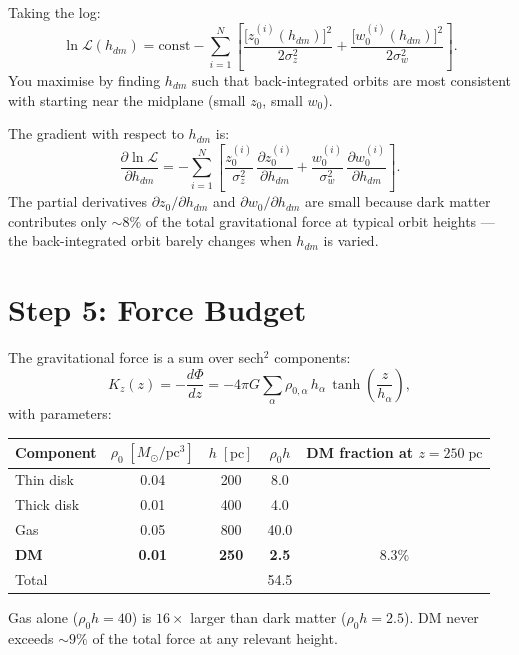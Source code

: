 \documentclass[12pt]{article}
\begin{document}
Taking the log:
\[
  \ln\mathcal{L}(h_{dm})
  = \mathrm{const}
    - \sum_{i=1}^{N}
      \left[
        \frac{\bigl[z_0^{(i)}(h_{dm})\bigr]^{2}}{2\sigma_z^{2}}
        +
        \frac{\bigl[w_0^{(i)}(h_{dm})\bigr]^{2}}{2\sigma_w^{2}}
      \right].
\]
You maximise by finding $h_{dm}$ such that back-integrated orbits are most
consistent with starting near the midplane (small $z_0$, small $w_0$).

The gradient with respect to $h_{dm}$ is:
\[
  \frac{\partial \ln\mathcal{L}}{\partial h_{dm}}
  = -\sum_{i=1}^{N}
    \left[
      \frac{z_0^{(i)}}{\sigma_z^{2}}\,\frac{\partial z_0^{(i)}}{\partial h_{dm}}
      +
      \frac{w_0^{(i)}}{\sigma_w^{2}}\,\frac{\partial w_0^{(i)}}{\partial h_{dm}}
    \right].
\]
The partial derivatives $\partial z_0/\partial h_{dm}$ and $\partial w_0/\partial h_{dm}$
are small because dark matter contributes only $\sim 8\%$ of the total gravitational
force at typical orbit heights --- the back-integrated orbit barely changes when
$h_{dm}$ is varied.

\section*{Step 5: Force Budget}

The gravitational force is a sum over sech$^2$ components:
\[
  K_z(z) = -\frac{d\Phi}{dz}
  = -4\pi G\sum_\alpha \rho_{0,\alpha}\,h_\alpha\,\tanh\!\left(\frac{z}{h_\alpha}\right),
\]
with parameters:

\vspace{0.5em}
\begin{center}
\begin{tabular}{lcccc}
\toprule
Component & $\rho_0\;[M_\odot/\mathrm{pc}^3]$ & $h\;[\mathrm{pc}]$
          & $\rho_0 h$ & DM fraction at $z=250\;\mathrm{pc}$ \\
\midrule
Thin disk  & 0.04 & 200 & 8.0  & \\
Thick disk & 0.01 & 400 & 4.0  & \\
Gas        & 0.05 & 800 & 40.0 & \\
\textbf{DM} & \textbf{0.01} & \textbf{250} & \textbf{2.5} & $\mathbf{8.3\%}$ \\
\midrule
Total      &      &     & 54.5 & \\
\bottomrule
\end{tabular}
\end{center}
\vspace{0.5em}

Gas alone ($\rho_0 h = 40$) is $16\times$ larger than dark matter ($\rho_0 h = 2.5$).
DM never exceeds $\sim 9\%$ of the total force at any relevant height.
\end{document}
